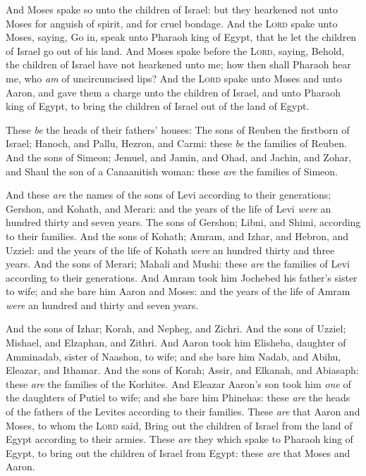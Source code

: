 \documentclass[11pt,letterpaper,oneside]{memoir}
\begin{document}
And Moses spake so unto the children of Israel: but they hearkened not
unto Moses for anguish of spirit, and for cruel bondage. And the
\textsc{Lord} spake unto Moses, saying, Go in, speak unto Pharaoh king
of Egypt, that he let the children of Israel go out of his land. And
Moses spake before the \textsc{Lord}, saying, Behold, the children of
Israel have not hearkened unto me; how then shall Pharaoh hear me, who
\emph{am} of uncircumcised lips? And the \textsc{Lord} spake unto Moses
and unto Aaron, and gave them a charge unto the children of Israel, and
unto Pharaoh king of Egypt, to bring the children of Israel out of the
land of Egypt.

These \emph{be} the heads of their fathers' houses: The sons of Reuben
the firstborn of Israel; Hanoch, and Pallu, Hezron, and Carmi: these
\emph{be} the families of Reuben. And the sons of Simeon; Jemuel, and
Jamin, and Ohad, and Jachin, and Zohar, and Shaul the son of a
Canaanitish woman: these \emph{are} the families of Simeon.

And these \emph{are} the names of the sons of Levi according to their
generations; Gershon, and Kohath, and Merari: and the years of the life
of Levi \emph{were} an hundred thirty and seven years. The sons of
Gershon; Libni, and Shimi, according to their families. And the sons of
Kohath; Amram, and Izhar, and Hebron, and Uzziel: and the years of the
life of Kohath \emph{were} an hundred thirty and three years. And the
sons of Merari; Mahali and Mushi: these \emph{are} the families of Levi
according to their generations. And Amram took him Jochebed his father's
sister to wife; and she bare him Aaron and Moses: and the years of the
life of Amram \emph{were} an hundred and thirty and seven years.

And the sons of Izhar; Korah, and Nepheg, and Zichri. And the sons of
Uzziel; Mishael, and Elzaphan, and Zithri. And Aaron took him Elisheba,
daughter of Amminadab, sister of Naashon, to wife; and she bare him
Nadab, and Abihu, Eleazar, and Ithamar. And the sons of Korah; Assir,
and Elkanah, and Abiasaph: these \emph{are} the families of the
Korhites. And Eleazar Aaron's son took him \emph{one} of the daughters
of Putiel to wife; and she bare him Phinehas: these \emph{are} the heads
of the fathers of the Levites according to their families. These
\emph{are} that Aaron and Moses, to whom the \textsc{Lord} said, Bring
out the children of Israel from the land of Egypt according to their
armies. These \emph{are} they which spake to Pharaoh king of Egypt, to
bring out the children of Israel from Egypt: these \emph{are} that Moses
and Aaron.
\end{document}
